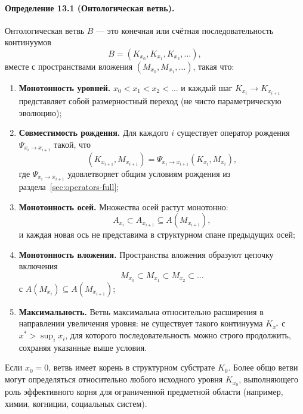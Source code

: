 \paragraph{Определение 13.1 (Онтологическая ветвь).}
Онтологическая ветвь \(B\) — это конечная или счётная последовательность
континуумов
\[
  B = (K_{x_0}, K_{x_1}, K_{x_2}, \dots),
\]
вместе с пространствами вложения \((M_{x_0}, M_{x_1}, \dots)\), такая что:
\begin{enumerate}
  \item \textbf{Монотонность уровней.}\quad
        \(x_0 < x_1 < x_2 < \dots\) и каждый шаг
        \(K_{x_i} \to K_{x_{i+1}}\) представляет собой размерностный
        переход (не чисто параметрическую эволюцию);
  \item \textbf{Совместимость рождения.}\quad
        Для каждого \(i\) существует оператор рождения
        \(\Psi_{x_i\to x_{i+1}}\) такой, что
        \[
          (K_{x_{i+1}}, M_{x_{i+1}}) =
            \Psi_{x_i\to x_{i+1}}(K_{x_i}, M_{x_i}),
        \]
        где \(\Psi_{x_i\to x_{i+1}}\) удовлетворяет общим условиям рождения
        из раздела~\ref{sec:operators-full};
  \item \textbf{Монотонность осей.}\quad
        Множества осей растут монотонно:
        \[
          A_{x_i} \subset A_{x_{i+1}}
          \subseteq A(M_{x_{i+1}}),
        \]
        и каждая новая ось не представима в структурном спане предыдущих осей;
  \item \textbf{Монотонность вложения.}\quad
        Пространства вложения образуют цепочку включения
        \[
          M_{x_0} \subset M_{x_1} \subset M_{x_2} \subset \dots
        \]
        с \(A(M_{x_i}) \subseteq A(M_{x_{i+1}})\);
  \item \textbf{Максимальность.}\quad
        Ветвь максимальна относительно расширения в направлении увеличения
        уровня: не существует такого континуума \(K_{x^{\ast}}\) с
        \(x^{\ast} > \sup_i x_i\), для которого последовательность можно
        строго продолжить, сохраняя указанные выше условия.
\end{enumerate}

Если \(x_0 = 0\), ветвь имеет корень в структурном субстрате \(K_0\). Более
общо ветви могут определяться относительно любого исходного уровня
\(K_{x_0}\), выполняющего роль эффективного корня для ограниченной
предметной области (например, химии, когниции, социальных систем).

